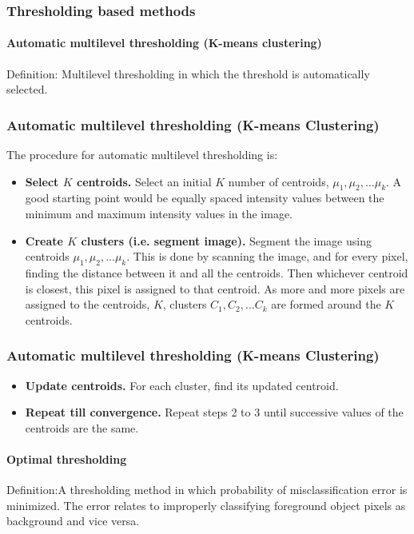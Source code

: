 \begin{frame}
\frametitle{Thresholding based methods} 
\framesubtitle{Automatic multilevel thresholding (K-means clustering)}
	\begin{block}{Definition:}
		Multilevel thresholding in which the threshold is automatically selected.
	\end{block}
\end{frame}





\begin{frame}
\frametitle{Automatic multilevel thresholding (K-means Clustering)}
\logoCSIPCPL\mypagenum
	The procedure for automatic multilevel thresholding is:
	\begin{itemize}
		\item \textbf{Select $K$ centroids.}  Select an initial $K$ number of centroids, $\mu_1, \mu_2, ... \mu_k$.  A good starting point would be equally spaced intensity values between the minimum and maximum intensity values in the image.
		\item \textbf{Create $K$ clusters (i.e. segment image).}  Segment the image using centroids $\mu_1, \mu_2, ... \mu_k$. This is done by scanning the image, and for every pixel, finding the distance between it and all the centroids.  Then whichever centroid is closest, this pixel is assigned to that centroid.  As more and more pixels are assigned to the centroids, $K$, clusters $C_1, C_2, \ldots C_k$ are formed around the $K$ centroids.\\
	\end{itemize}
\end{frame}








\begin{frame}
\frametitle{Automatic multilevel thresholding (K-means  Clustering)}
\logoCSIPCPL\mypagenum
	\begin{itemize}
		\item \textbf{Update centroids.}  For each cluster, find its updated centroid.
		\item \textbf{Repeat till convergence.}  Repeat steps 2 to 3 until successive values of the centroids are the same.
	\end{itemize}
\end{frame}






\begin{frame}
\framesubtitle{Optimal thresholding}
\logoCSIPCPL\mypagenum
	\begin{block}{Definition:}A thresholding method in which probability of misclassification error is minimized.  The error relates to improperly classifying foreground object pixels as background and vice versa.
	\end{block}
\end{frame}





